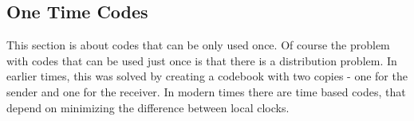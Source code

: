 \subsection{One Time Codes}
This section is about codes that can be only used once.  
Of course the problem with codes that can be used just once is that there is a distribution problem.
In earlier times, this was solved by creating a codebook with two copies - one for the sender and one for the receiver. 
In modern times there are time based codes, that depend on minimizing the difference between local clocks.